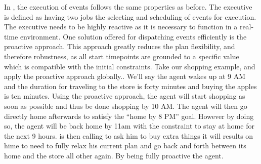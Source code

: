

In \cite{mus97}, the execution of events follows the same
properties as before.  The executive is defined as having two jobs the
selecting and scheduling of events for execution. The executive needs to
be highly reactive as it is necessary to function in a real-time
environment. One solution offered for dispatching events efficiently
is the proactive approach. This approach greatly reduces the plan
flexibility, and therefore robustness, as all start timepoints are
grounded to a specific value which is compatible with the initial
constraints. Take our shopping example, and apply the proactive
approach globally..  We'll say the agent wakes up
at 9 AM and the duration for traveling to the store is forty minutes
and buying the apples is ten minutes. Using the proactive approach, the
agent will start shopping as soon as possible and thus be done shopping
by 10 AM. The agent will then go directly home afterwards to satisfy the
``home by 8 PM'' goal. However by doing so, the agent will be back
home by 11am with the constraint to stay at home for the next 9
hours. 
 is then calling to ask him to buy extra things it will
results on hime to need to fully relax his current plan and go back
and forth between its home and the store all other again. By being
fully proactive the agent.


